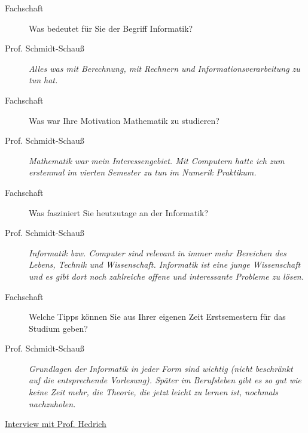 \begin{description}

\item[Fachschaft] 

Was bedeutet für Sie der Begriff Informatik?

\item[Prof. Schmidt-Schauß]
 
\textit{Alles was mit  Berechnung, mit Rechnern und Informationsverarbeitung zu tun hat.}

\item[Fachschaft]

Was war Ihre Motivation Mathematik zu studieren?

\item[Prof. Schmidt-Schauß]

\textit{Mathematik war mein Interessengebiet. Mit Computern hatte ich zum erstenmal im vierten Semester zu tun im Numerik Praktikum.}

\item[Fachschaft]

Was fasziniert Sie heutzutage an der Informatik?

\item[Prof. Schmidt-Schauß]

\textit{Informatik bzw. Computer sind relevant in immer mehr Bereichen des Lebens, Technik und Wissenschaft.
Informatik ist eine junge Wissenschaft und es gibt dort noch zahlreiche offene und interessante Probleme zu lösen.}

\item[Fachschaft]

Welche Tipps können Sie aus Ihrer eigenen Zeit Erstsemestern für das Studium geben?

\item[Prof. Schmidt-Schauß]

\textit{Grundlagen der Informatik in jeder Form sind wichtig (nicht beschränkt auf die entsprechende Vorlesung). Später im Berufsleben gibt es so gut wie keine Zeit mehr, die Theorie, die jetzt leicht zu lernen ist, nochmals nachzuholen.}

\end{description}


\begin{flushleft}\underline{Interview mit Prof. Hedrich} \end{flushleft}

